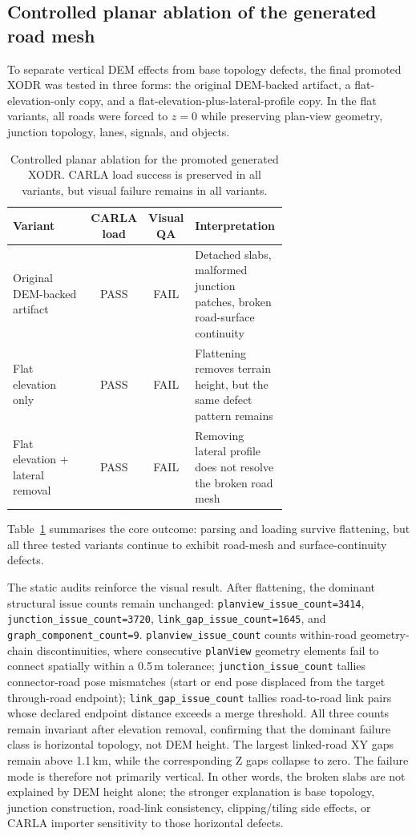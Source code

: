 \subsection{Controlled planar ablation of the generated road mesh}
To separate vertical DEM effects from base topology defects, the final promoted XODR was tested in three forms: the original DEM-backed artifact, a flat-elevation-only copy, and a flat-elevation-plus-lateral-profile copy. In the flat variants, all roads were forced to $z=0$ while preserving plan-view geometry, junction topology, lanes, signals, and objects.

\begin{table}[htbp]
\centering
\small
\begin{tabular}{@{}p{0.34\linewidth}ccp{0.34\linewidth}@{}}
\hline
Variant & CARLA load & Visual QA & Interpretation \\
\hline
Original DEM-backed artifact & PASS & FAIL & Detached slabs, malformed junction patches, broken road-surface continuity \\
Flat elevation only & PASS & FAIL & Flattening removes terrain height, but the same defect pattern remains \\
Flat elevation + lateral removal & PASS & FAIL & Removing lateral profile does not resolve the broken road mesh \\
\hline
\end{tabular}
\caption{Controlled planar ablation for the promoted generated XODR. CARLA load success is preserved in all variants, but visual failure remains in all variants.}
\label{tab:carla_planar_ablation}
\end{table}

Table~\ref{tab:carla_planar_ablation} summarises the core outcome: parsing and loading survive flattening, but all three tested variants continue to exhibit road-mesh and surface-continuity defects.

The static audits reinforce the visual result. After flattening, the dominant structural issue counts remain unchanged: \texttt{planview\_issue\_count=3414}, \texttt{junction\_issue\_count=3720}, \texttt{link\_gap\_issue\_count=1645}, and \texttt{graph\_component\_count=9}. \texttt{planview\_issue\_count} counts within-road geometry-chain discontinuities, where consecutive \texttt{planView} geometry elements fail to connect spatially within a 0.5\,m tolerance; \texttt{junction\_issue\_count} tallies connector-road pose mismatches (start or end pose displaced from the target through-road endpoint); \texttt{link\_gap\_issue\_count} tallies road-to-road link pairs whose declared endpoint distance exceeds a merge threshold. All three counts remain invariant after elevation removal, confirming that the dominant failure class is horizontal topology, not DEM height. The largest linked-road XY gaps remain above 1.1\,km, while the corresponding Z gaps collapse to zero. The failure mode is therefore not primarily vertical. In other words, the broken slabs are not explained by DEM height alone; the stronger explanation is base topology, junction construction, road-link consistency, clipping/tiling side effects, or CARLA importer sensitivity to those horizontal defects.

